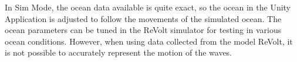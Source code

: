
In Sim Mode, the ocean data available is quite exact, so the ocean in the Unity Application is adjusted to follow the movements of the simulated ocean. The ocean parameters can be tuned in the ReVolt simulator for testing in various ocean conditions. However, when using data collected from the model ReVolt, it is not possible to accurately represent the motion of the waves.

